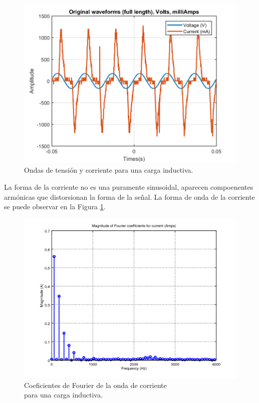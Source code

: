 \documentclass[journal]{IEEEtran}
\begin{document}
\begin{figure}[h]
\centering
\includegraphics[clip,width=0.9\columnwidth]
{original_waveform_drill.png}
\caption{Ondas de tensión y corriente para una carga
inductiva.}
\label{original_inductive_load}
\end{figure}

La forma de la corriente no es una puramente sinusoidal,
aparecen compoenentes armónicas que distorsionan la forma 
de la señal. La forma de onda de la corriente
se puede observar en la Figura 
\ref{original_inductive_load}.

\begin{figure}[h]
\centering
\includegraphics[clip,width=0.9\columnwidth]
{zoomed_current_furier_coefficients_drill.png}
\caption{Coeficientes de Fourier de la  
onda de corriente \\ para una carga inductiva.}
\label{fourier_corrent_coefficients_inductive}
\end{figure}
\end{document}
